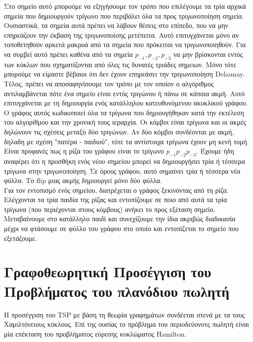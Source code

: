 \documentclass[oneside,12pt]{book}
\theoremstyle{definition}
\begin{document}
Στο σημείο αυτό μπορούμε να εξηγήσουμε τον τρόπο που επιλέγουμε τα τρία αρχικά σημεία που δημιουργούν τρίγωνο που περιβάλει όλα τα προς τριγωνοποίηση σημεία. Ουσιαστικά, τα σημεία αυτά πρέπει να λάβουν θέσεις στο επίπεδο, που να μην επηρεάζουν την έκβαση της τριγωνοποίσης μετέπειτα. Αυτό επιτυγχάνεται μόνο αν τοποθετηθούν αρκετά μακρυά από τα σημεία που πρόκειται να τριγωνοποιηθούν. Για να συμβεί αυτό πρέπει καθένα από τα σημεία \(p_{-1}, p_{-2}, p_{-3}\) να μην βρίσκονται εντός των κύκλων που σχηματίζονται από όλες τις δυνατές τριάδες σημειων. Μόνο τότε μπορούμε να είμαστε βέβαιοι ότι δεν έχουν επηρεάσει την τριγωνοποίηση Delaunay. \\

Τέλος, πρέπει να αποσαφηνίσουμε τον τρόπο με τον οποίον ο αλγόριθμος αντιλαμβάνεται πότε ένα σημείο είναι εντός τριγώνου ή πάνω σε κάποια ακμή. Αυτό επιτυγχάνεται με τη δημιουργία ενός κατάλληλου κατευθυνόμενου ακυκλικού γράφου. Ο γράφος αυτός κωδικοποιεί όλα τα τρίγωνα που δημιουγήθηκαν κατά την εκτέλεση του αλγορίθμου και την χρονική τους ιεραρχία. Οι κόμβοι είναι τρίγωνα και οι ακμές δηλώνουν τις σχέσεις μεταξύ δύο τριγώνων. Αν δύο κόμβοι συνδέονται με ακμή, δηλαδη με σχέση "πατέρα - παιδιού", τότε τα αντίστοιχα τρίγωνα έχουν μη κενή τομή. Είναι προφανές πως η ρίζα του γράφου είναι το τρίγωνο \(p_{-1} p_{-2} p_{-3}\). Έχουμε ήδη αναφέρει ότι η προσθήκη ενός νέου σημείου μπορεί να δημιουργήσει τρία ή τέσσερα τρίγωνα στην τριγωνοποίηση. Σε όρους γράφου, αυτό σημαίνει τρία ή τέσσερα νέα φύλλα. Το flip μιας ακμής δημιουργεί μόνο δύο φύλλα. \\

Για τον εντοπισμό ενός σημείου, διατρέχεται ο γράφος ξεκινόντας από τη ρίζα. Ελέγχονται τα τρία παιδία της ρίζας και εντοπίζουμε σε ποιο από αυτά τα τρία τρίγωνα (που περιέχονται στους κόμβους) ανήκει το προς εξέταση σημείο. Μεταβαίνουμε στο κατάλληλο παιδί και συνεχίζουμε την ίδια ακριβώς διαδικασία μέχρι να φτάσουμε σε φύλλο του γράφου στο οποίο και εντοπίζεται το σημείο που εξετάζουμε. \\ 

\chapter{Γραφοθεωρητική Προσέγγιση του Προβλήματος του πλανόδιου πωλητή}
 
Η προσέγγιση του TSP με βάση τη θεωρία γραφημάτων συνδέεται στενά με τα τους Χαμιλτόνειους κύκλους. Επί της ουσίας το πρόβλημα του περιοδεύονοτς πωλητή είναι μία επέκταση του προβλήματος εύρεσης κυκλώματος Hamilton. \\ 
\end{document}
